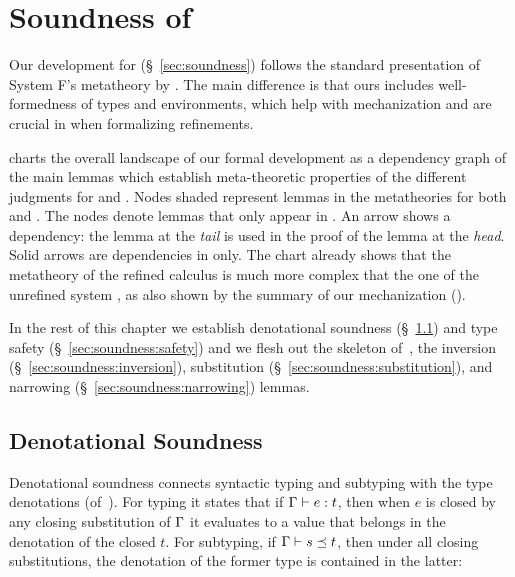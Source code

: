 \chapter{Soundness of \sysrf} 
\label{ch:soundness}





Our development for \sysf (\S~\ref{sec:soundness})
follows the standard presentation of System F's
metatheory by \citet{TAPL}.
%
The main difference 
is that ours includes well-formedness of types and
environments, which help with mechanization \cite{Remy21}
and are crucial in \sysrf when formalizing refinements.
%

%
%
 charts the overall
landscape of our formal development as a
dependency graph of the main lemmas which
establish meta-theoretic properties of the
different judgments for \sysf and \sysrf.
%
Nodes shaded \colboth represent lemmas
in the metatheories for both \sysf and \sysrf.
%
The \colref nodes denote lemmas
that only appear in %
\sysrf.
%
An arrow shows a dependency: the lemma at the
\emph{tail} is used in the proof of the lemma at
the \emph{head}. %
Solid arrows are dependencies in \sysrf only.
The chart already shows that the metatheory of 
the refined calculus \sysrf is much more complex 
that the one of the unrefined system \sysf, 
as also shown by the summary 
of our mechanization ().

In the rest of this chapter
we establish 
denotational soundness (\S~\ref{sec:soundness:denotational}) and 
type safety (\S~\ref{sec:soundness:safety})
and we flesh out the skeleton of~, \ie  
the inversion (\S~\ref{sec:soundness:inversion}),
substitution (\S~\ref{sec:soundness:substitution}),
and narrowing (\S~\ref{sec:soundness:narrowing}) lemmas.





\section{Denotational Soundness}
\label{sec:soundness:denotational}
\label{sec:denot:soundness}

Denotational soundness connects syntactic typing and subtyping 
with the type denotations (of~).
For typing it states that if
${\mathrm{\Gamma}} \vdash {e} : {t}$,
then when $e$ is closed by any closing substitution of $\mathrm{\Gamma}$
it evaluates to a value that belongs in the denotation of the closed $t$.
For subtyping,
if ${\mathrm{\Gamma}} \vdash s \preceq t$, then
under all closing substitutions, the denotation of the
former type is contained in the latter:

